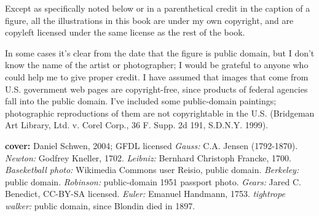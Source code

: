 {}

\footnotesize

Except as specifically noted below or in a parenthetical credit in the
caption of a figure, all the illustrations in this book are
under my own copyright, and are copyleft licensed under the same license
as the rest of the book. 

In some cases it's clear from the date that the
figure is public domain, but I don't know the name of the artist or photographer; I would
be grateful to anyone who could help me to give proper credit.
I have assumed that images
that come from U.S. government web pages are copyright-free, since products
of federal agencies fall into the public domain.
I've included some
public-domain paintings; photographic reproductions of them are not
copyrightable in the U.S. (Bridgeman Art Library, Ltd. v. Corel Corp.,
36 F. Supp. 2d 191, S.D.N.Y. 1999).

\begin{sloppypar}
\noindent

\newcommand{\photocredit}[1]{\footnotesize{(\textit{#1})}}%
\newcommand{\docred}[3]{\textbf{#1} \emph{#2:} #3.\quad}
\newcommand{\cred}[3]{\docred{\pageref{fig:#1}}{#2}{#3}}
\newcommand{\credtwo}[4]{\docred{\pageref{fig:#1},\pageref{fig:#2}}{#3}{#4}}
\newcommand{\credthree}[5]{\docred{\pageref{fig:#1},\pageref{fig:#2},\pageref{fig:#3}}{#4}{#5}}

\textbf{cover:} Daniel Schwen, 2004; GFDL licensed
\cred{gauss}{Gauss}{C.A. Jensen (1792-1870)}
\cred{newton}{Newton}{Godfrey Kneller, 1702}
\cred{leibniz}{Leibniz}{Bernhard Christoph Francke, 1700}
\cred{basketball}{Baseketball photo}{Wikimedia Commons user Reisio, public domain}
\cred{berkeley}{Berkeley}{public domain}
\cred{robinson}{Robinson}{public-domain 1951 passport photo}
\cred{gear-ratio}{Gears}{Jared C. Benedict, CC-BY-SA licensed}%
\cred{euler}{Euler}{Emanuel Handmann, 1753}
\cred{blondin}{tightrope walker}{public domain, since Blondin died in 1897}

\end{sloppypar}\normalsize
